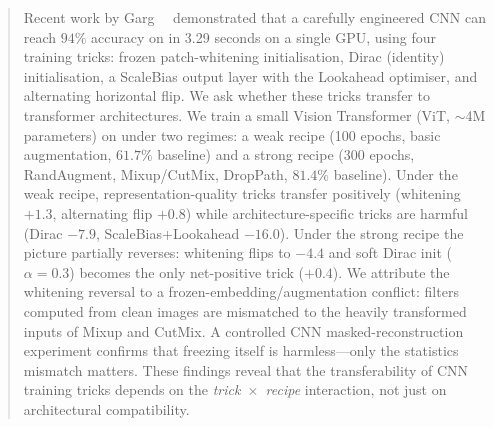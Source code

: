 \begin{abstract}
    Recent work by Garg~\etal~\cite{garg2024cifar10} demonstrated that a carefully engineered CNN can reach $94\%$ accuracy on \cifar{} in 3.29 seconds on a single GPU, using four training tricks: frozen patch-whitening initialisation, Dirac (identity) initialisation, a ScaleBias output layer with the Lookahead optimiser, and alternating horizontal flip.
    We ask whether these tricks transfer to transformer architectures.
    We train a small Vision Transformer (ViT, $\sim$4M parameters) on \cifar{} under two regimes: a weak recipe (100 epochs, basic augmentation, $61.7\%$ baseline) and a strong recipe (300 epochs, RandAugment, Mixup/CutMix, DropPath, $81.4\%$ baseline).
    Under the weak recipe, representation-quality tricks transfer positively (whitening $+1.3$\pp{}, alternating flip $+0.8$\pp{}) while architecture-specific tricks are harmful (Dirac $-7.9$\pp{}, ScaleBias+Lookahead $-16.0$\pp{}).
    Under the strong recipe the picture partially reverses: whitening flips to $-4.4$\pp{} and soft Dirac init ($\alpha{=}0.3$) becomes the only net-positive trick ($+0.4$\pp{}).
    We attribute the whitening reversal to a frozen-embedding/augmentation conflict: filters computed from clean images are mismatched to the heavily transformed inputs of Mixup and CutMix.
    A controlled CNN masked-reconstruction experiment confirms that freezing itself is harmless---only the statistics mismatch matters.
    These findings reveal that the transferability of CNN training tricks depends on the \emph{trick~$\times$~recipe} interaction, not just on architectural compatibility.
\end{abstract}

